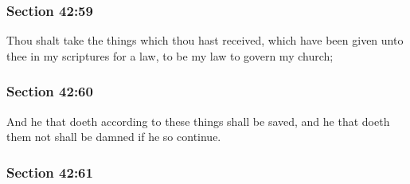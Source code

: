 
	\subsubsection{Section 42:59} %
		\label{DC42-59}

		Thou shalt take the things which thou hast received, which have been given unto thee in my scriptures for a law, to be my law to govern my church;


	\subsubsection{Section 42:60} %
		\label{DC42-60}

		And he that doeth according to these things shall be saved, and he that doeth them not shall be damned if he so continue.


	\subsubsection{Section 42:61} %
		\label{DC42-61}

